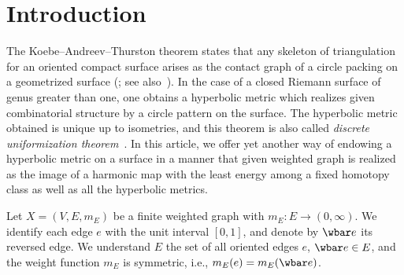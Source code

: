 \section{Introduction}


The Koebe--Andreev--Thurston theorem states that any skeleton of triangulation for an oriented compact surface arises as the contact graph of a circle packing on a geometrized surface (\cite[Section~13.7]{Thurston}; see also~\cite{ColindeVerdiere}). In the case of a closed Riemann surface of genus greater than one, one obtains a hyperbolic metric which realizes given combinatorial structure by a circle pattern on the surface. The hyperbolic metric obtained is unique up to isometries, and this theorem is also called \emph{discrete uniformization theorem}~\cite[Chapter~4]{Stephenson}. In this article, we offer yet another way of endowing a hyperbolic metric on a surface in a manner that given weighted graph is realized as the image of a harmonic map with the least energy among a fixed homotopy class as well as all the hyperbolic metrics.



Let $X=(V, E, m_E)$ be a finite weighted graph with $m_E: E \to (0, \infty)$. We identify each edge $e$ with the unit interval $[0, 1]$, and denote by $\wbar e$ its reversed edge. We understand $E$ the set of all oriented edges $e$, $\wbar e \in E$, and the weight function $m_E$ is symmetric, i.e., $m_E(e)=m_E(\wbar e)$.


